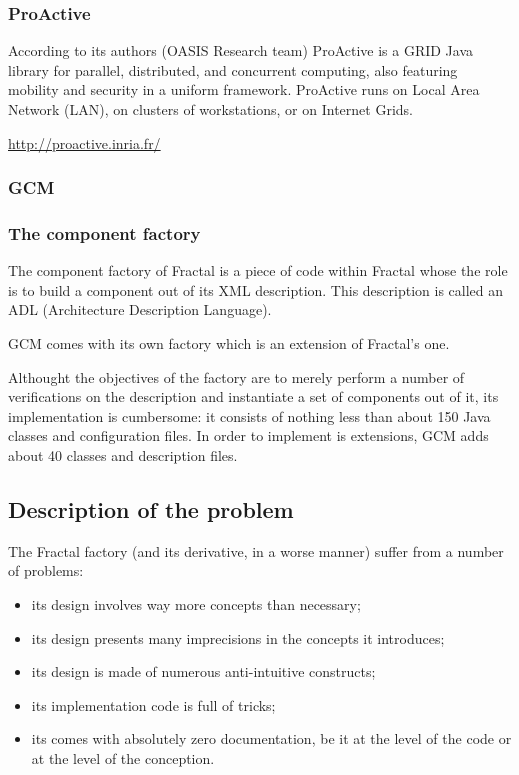 \documentclass{article}
\newcommand{\urll}[1]{\begin{center}\url{#1}\end{center}}
\begin{document}
\subsubsection{ProActive}

According to its authors (OASIS Research team)
ProActive is a GRID Java library for parallel, distributed, and concurrent computing, also featuring mobility and security in a uniform framework.
ProActive runs on Local Area Network (LAN), on clusters of workstations, or on Internet Grids.
\urll{http://proactive.inria.fr/}

\subsubsection{GCM}

\subsubsection{The component factory}
The component factory of Fractal is a piece of code within Fractal whose the role  is to build a component out of its XML description. This description
is called an ADL (Architecture Description Language).


GCM comes with its own factory which is an extension of Fractal's one.

Althought the objectives of the factory are to merely perform a number of verifications
on the description and instantiate a set of components out of it, its implementation is cumbersome: it consists of nothing
less than about 150 Java classes and configuration files.
In order to implement is extensions, GCM adds about 40 classes and description files.


\subsection{Description of the problem}
The Fractal factory (and its derivative, in a worse manner) suffer from a number of problems:
\begin{itemize}
  \item its design involves way more concepts than necessary;
  \item its design presents many imprecisions in the concepts it introduces;
  \item its design is made of numerous anti-intuitive constructs;
  \item its implementation code is full of tricks;
  \item its comes with absolutely zero documentation, be it at the level of the code or at the level of the conception.
\end{itemize} 
\end{document}
